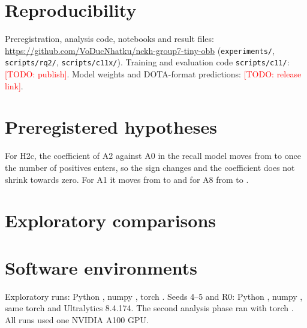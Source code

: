 \documentclass[11pt]{article}
\newcommand{\todo}[1]{\textcolor{red}{[TODO: #1]}}
\begin{document}
\section*{Reproducibility}
Preregistration, analysis code, notebooks and result files: \url{https://github.com/VoDucNhatku/nckh-group7-tiny-obb}
(\texttt{experiments/}, \texttt{scripts/rq2/}, \texttt{scripts/c11x/}). Training and evaluation code \texttt{scripts/c11/}:
\todo{publish}. Model weights and DOTA-format predictions: \todo{release link}.

\appendix
\section{Preregistered hypotheses}\label{app:prereg}
\begin{table}[h]\centering\caption{Every preregistered hypothesis and its outcome. H-items ran on the twelve exploratory runs before
the preregistration was merged and are exploratory; H2b and H2c use validation images and the NMS head; P1 and M-items follow the
annex fixed before seeds 4--5 (M1 and M3 use seeds 1--5 on test).}\label{tab:prereg}\scriptsize\end{table}

For H2c, the coefficient of A2 against A0 in the recall model moves from \medAtwoWo{} to \medAtwoW{} once the number of positives
enters, so the sign changes and the coefficient does not shrink towards zero. For A1 it moves from \medAoneWo{} to \medAoneW{} and for A8
from \medAeightWo{} to \medAeightW.

\section{Exploratory comparisons}\label{app:explor}
\begin{table}[h]\centering\caption{Seeds 1--3, woX test. Scene: scene-clustered bootstrap only. Scene + seed: combined interval with
$t$ on two degrees of freedom.}\label{tab:explor}\scriptsize\end{table}

\section{Software environments}\label{app:env}
Exploratory runs: Python \envOldPython, numpy \envOldNumpy, torch \envOldTorch. Seeds 4--5 and R0: Python \envNewPython, numpy
\envNewNumpy, same torch and Ultralytics 8.4.174. The second analysis phase ran with torch \envPhTwoTorch. All runs used one
NVIDIA A100 GPU.



\end{document}
